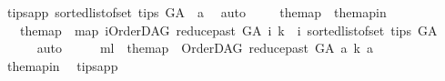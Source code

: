 \begin{isabellebody}
\ tips{\isacharunderscore}{\kern0pt}app{\isacharcolon}{\kern0pt}\ {\isachardoublequoteopen}{\isacharparenleft}{\kern0pt}sorted{\isacharunderscore}{\kern0pt}list{\isacharunderscore}{\kern0pt}of{\isacharunderscore}{\kern0pt}set\ {\isacharparenleft}{\kern0pt}tips\ G{\isacharunderscore}{\kern0pt}A{\isacharparenright}{\kern0pt}{\isacharparenright}{\kern0pt}\ {\isacharequal}{\kern0pt}\ {\isacharbrackleft}{\kern0pt}a{\isacharbrackright}{\kern0pt}{\isachardoublequoteclose}\ \isamarkupfalse%
\ auto\ \isanewline
\ \ \isamarkupfalse%
\ the{\isacharunderscore}{\kern0pt}map\ \ the{\isacharunderscore}{\kern0pt}map{\isacharunderscore}{\kern0pt}in{\isacharcolon}{\kern0pt}\isanewline
\ \ \ {\isachardoublequoteopen}the{\isacharunderscore}{\kern0pt}map\ {\isacharequal}{\kern0pt}\ {\isacharparenleft}{\kern0pt}{\isacharparenleft}{\kern0pt}map\ {\isacharparenleft}{\kern0pt}{\isasymlambda}i{\isachardot}{\kern0pt}{\isacharparenleft}{\kern0pt}{\isacharparenleft}{\kern0pt}{\isacharparenleft}{\kern0pt}OrderDAG\ {\isacharparenleft}{\kern0pt}reduce{\isacharunderscore}{\kern0pt}past\ G{\isacharunderscore}{\kern0pt}A\ i{\isacharparenright}{\kern0pt}\ k{\isacharparenright}{\kern0pt}{\isacharparenright}{\kern0pt}\ {\isacharcomma}{\kern0pt}\ i{\isacharparenright}{\kern0pt}{\isacharparenright}{\kern0pt}\ {\isacharparenleft}{\kern0pt}sorted{\isacharunderscore}{\kern0pt}list{\isacharunderscore}{\kern0pt}of{\isacharunderscore}{\kern0pt}set\ {\isacharparenleft}{\kern0pt}tips\ G{\isacharunderscore}{\kern0pt}A{\isacharparenright}{\kern0pt}{\isacharparenright}{\kern0pt}{\isacharparenright}{\kern0pt}{\isacharparenright}{\kern0pt}{\isachardoublequoteclose}\isanewline
\ \ \ \ \isamarkupfalse%
\ auto\isanewline
\ \ \isamarkupfalse%
\ \isamarkupfalse%
\ m{\isacharunderscore}{\kern0pt}l{\isacharcolon}{\kern0pt}\ {\isachardoublequoteopen}\ the{\isacharunderscore}{\kern0pt}map\ {\isacharequal}{\kern0pt}\ {\isacharbrackleft}{\kern0pt}{\isacharparenleft}{\kern0pt}{\isacharparenleft}{\kern0pt}OrderDAG\ {\isacharparenleft}{\kern0pt}reduce{\isacharunderscore}{\kern0pt}past\ G{\isacharunderscore}{\kern0pt}A\ a{\isacharparenright}{\kern0pt}\ k{\isacharparenright}{\kern0pt}{\isacharcomma}{\kern0pt}\ a{\isacharparenright}{\kern0pt}{\isacharbrackright}{\kern0pt}{\isachardoublequoteclose}\isanewline
\ \ \ \ \isamarkupfalse%
\ the{\isacharunderscore}{\kern0pt}map{\isacharunderscore}{\kern0pt}in\ \isamarkupfalse%
\ tips{\isacharunderscore}{\kern0pt}app\ \isamarkupfalse%

\end{isabellebody}

